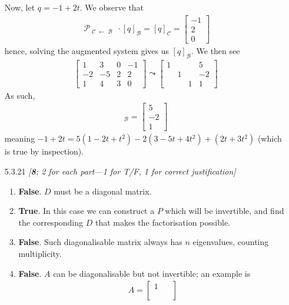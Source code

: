 \documentclass{amsart}
\theoremstyle{definition}
\theoremstyle{definition}
\DeclareMathOperator{\1}{\mathbbm{1}}
\DeclareMathOperator{\powerset}{\mathcal{P}}
\DeclareMathOperator{\B}{\mathcal{B}}
\DeclareMathOperator{\CC}{\mathcal{C}}
\begin{document}
\begin{enumerate}[itemsep = 2mm]
		Now, let $q = -1 + 2t$. We observe that
		\begin{align*}
		\powerset_{\CC \leftarrow \B} \cdot [q]_{\B} = [q]_{\CC} = \begin{bmatrix}
		- 1 \\ 2 \\ 0
		\end{bmatrix}
		\end{align*}
		hence, solving the augmented system gives us $[q]_{\B}$. We then see 
		\begin{align*}
		\begin{bmatrix}%
		1 & 3 & 0 & -1 \\ -2 & -5 & 2 &2 \\ 1 & 4 & 3 & 0
		\end{bmatrix} \leadsto \begin{bmatrix}
		1 & & & 5 \\ & 1 &  & -2 \\ &  & 1 & 1
		\end{bmatrix}
		\end{align*}
		As such,
		\begin{align*}
			[q]_{\B} = \begin{bmatrix}
			5 \\ -2 \\ 1
			\end{bmatrix}
		\end{align*}
		meaning $-1+2t = 5(1 - 2t + t^2) - 2(3 - 5t + 4t^2) + (2t + 3t^2)$ (which is true by inspection).
		
		\item[5.3.21] \textit{[\textbf{8}; 2 for each part---1 for T/F, 1 for correct justification]}
		
		\begin{enumerate}
			\item \textbf{False}. $D$ must be a diagonal matrix.
			
			\item \textbf{True}. In this case we can construct a $P$ which will be invertible, and find the corresponding $D$ that makes the factorisation possible.
			
			\item \textbf{False}. Such diagonalisable matrix always has $n$ eigenvalues, counting multiplicity.
			
			\item \textbf{False}. $A$ can be diagonalisable but not invertible; an example is
			\begin{align*}
			A = \begin{bmatrix}
			1 &  \\  & \phantom{0}
			\end{bmatrix}
			\end{align*}
		\end{enumerate}
		

\end{enumerate}
\end{document}
